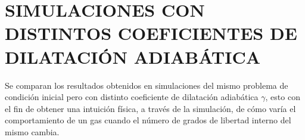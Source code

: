 \chapter{SIMULACIONES CON DISTINTOS COEFICIENTES DE DILATACIÓN ADIABÁTICA}
Se comparan los resultados obtenidos en simulaciones del mismo problema de condición inicial pero con distinto coeficiente de dilatación adiabática $\gamma$, esto con el fin de obtener una intuición física, a través de la simulación, de cómo varía el comportamiento de un gas cuando el número de grados de libertad interno del mismo cambia.